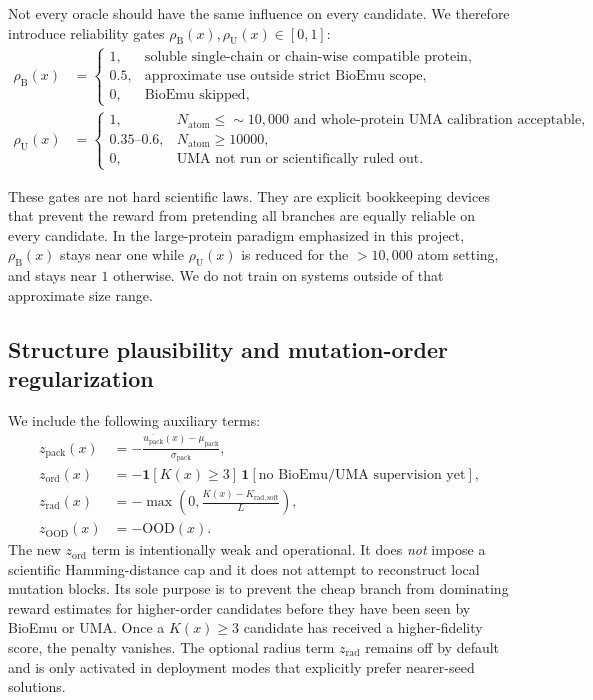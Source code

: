 \documentclass[11pt]{article}
\newcommand{\packunc}{\ensuremath{u_{\mathrm{pack}}}}
\begin{document}
Not every oracle should have the same influence on every candidate. We therefore introduce reliability gates $\rho_{\mathrm B}(x),\rho_{\mathrm U}(x)\in[0,1]$:
\begin{align}
    \rho_{\mathrm B}(x) &=
    \begin{cases}
        1, & \text{soluble single-chain or chain-wise compatible protein},\\
        0.5, & \text{approximate use outside strict BioEmu scope},\\
        0, & \text{BioEmu skipped},
    \end{cases}\\
    \rho_{\mathrm U}(x) &=
    \begin{cases}
        1, & N_{\mathrm{atom}}\leq \sim 10,000 \text{ and whole-protein UMA calibration acceptable},\\
        0.35\text{--}0.6, &  N_{\mathrm{atom}}\geq 10000,\\
        0, & \text{UMA not run or scientifically ruled out}.
    \end{cases}
\end{align}

These gates are not hard scientific laws. They are explicit bookkeeping devices that prevent the reward from pretending all branches are equally reliable on every candidate. In the large-protein paradigm emphasized in this project, $\rho_{\mathrm B}(x)$ stays near one while $\rho_{\mathrm U}(x)$ is reduced for the $> 10,000$ atom setting, and stays near $1$ otherwise. We do not train on systems outside of that approximate size range. 


\subsection{Structure plausibility and mutation-order regularization}

We include the following auxiliary terms:
\begin{align}
    z_{\mathrm{pack}}(x) &= -\frac{\overline{\packunc}(x)-\mu_{\mathrm{pack}}}{\sigma_{\mathrm{pack}}},\\
    z_{\mathrm{ord}}(x) &= -\mathbf{1}[K(x)\ge 3]\,\mathbf{1}[\text{no BioEmu/UMA supervision yet}],\\
    z_{\mathrm{rad}}(x) &= -\max\!\left(0,\frac{K(x)-K_{\mathrm{rad,soft}}}{L}\right),\\
    z_{\mathrm{OOD}}(x) &= -\mathrm{OOD}(x).
\end{align}
The new $z_{\mathrm{ord}}$ term is intentionally weak and operational. It does \emph{not} impose a scientific Hamming-distance cap and it does not attempt to reconstruct local mutation blocks. Its sole purpose is to prevent the cheap branch from dominating reward estimates for higher-order candidates before they have been seen by BioEmu or UMA. Once a $K(x)\ge 3$ candidate has received a higher-fidelity score, the penalty vanishes. The optional radius term $z_{\mathrm{rad}}$ remains off by default and is only activated in deployment modes that explicitly prefer nearer-seed solutions.
\end{document}
